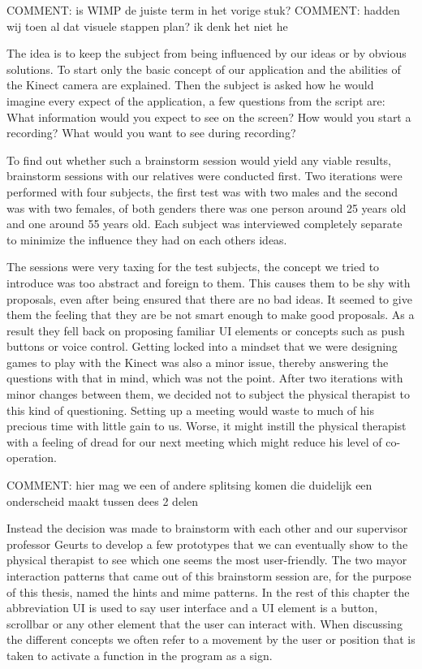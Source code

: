  {\large COMMENT: is WIMP de juiste term in het vorige stuk? }
 {\large COMMENT: hadden wij toen al dat visuele stappen plan? ik denk het niet he }

The idea is to keep the subject from being influenced by our ideas or by obvious solutions. To start only the basic concept of our application and the abilities of the Kinect camera are explained. Then the subject is asked how he would imagine every expect of the application, a few questions from the script are: What information would you expect to see on the screen? How would you start a recording? What would you want to see during recording? 

To find out whether such a brainstorm session would yield any viable results, brainstorm sessions with our relatives were conducted first. Two iterations were performed with four subjects, the first test was with two males and the second was with two females, of both genders there was one person around 25 years old and one around 55 years old. Each subject was interviewed completely separate to minimize the influence they had on each others ideas.

The sessions were very taxing for the test subjects, the concept we tried to introduce was too abstract and foreign to them. This causes them to be shy with proposals, even after being ensured that there are no bad ideas. It seemed to give them the feeling that they are be not smart enough to make good proposals. As a result they fell back on proposing  familiar UI elements or concepts such as push buttons or voice control. Getting locked into a mindset that we were designing games to play with the Kinect was also a minor issue, thereby answering the questions with that in mind, which was not the point. After two iterations with minor changes between them, we decided not to subject the physical therapist to this kind of questioning. Setting up a meeting would waste to much of his precious time with little gain to us. Worse, it might instill the physical therapist with a feeling of dread for our next meeting which might reduce his level of co-operation. 

 {\large COMMENT: hier mag we een of andere splitsing komen die duidelijk een onderscheid maakt tussen dees 2 delen}

Instead the decision was made to brainstorm with each other and our supervisor professor Geurts to develop a few prototypes that we can eventually show to the physical therapist to see which one seems the most user-friendly. The two mayor interaction patterns that came out of this brainstorm session are, for the purpose of this thesis, named the hints and mime patterns. In the rest of this chapter the abbreviation UI is used to say user interface and a UI element is a button, scrollbar or any other element that the user can interact with. When discussing the different concepts we often refer to a movement by the user or position that is taken to activate a function in the program as a sign.

